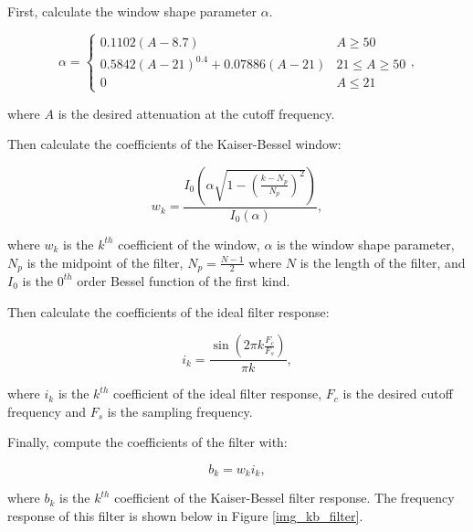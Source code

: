                 First, calculate the window shape parameter $\alpha$. 

                \begin{equation}
                    \alpha = 
                        \begin{cases}
                            0.1102(A - 8.7) & A \ge 50 \\
                            0.5842(A-21)^{0.4} + 0.07886(A-21) & 21 \leq A \geq 50 \\
                            0 & A \le 21
                        \end{cases},
                \end{equation}

                where $A$ is the desired attenuation at the cutoff frequency.

                Then calculate the coefficients of the Kaiser-Bessel window:

                \begin{equation}
                w_k = \frac{I_0(\alpha \sqrt{1 - (\frac{k - N_p}{N_p})^2})}{I_0(\alpha)},
                \end{equation}

                where $w_k$ is the $k^{th}$ coefficient of the window, $\alpha$ is the window shape parameter, $N_p$ is the midpoint of the filter, $N_p = \frac{N-1}{2}$ where $N$ is the length of the filter, and $I_0$ is the $0^{th}$ order Bessel function of the first kind.

                Then calculate the coefficients of the ideal filter response:

                \begin{equation}
                i_k = \frac{\sin(2\pi k\frac{F_c}{F_s})}{\pi k},
                \end{equation}

                where $i_k$ is the $k^{th}$ coefficient of the ideal filter response, $F_c$ is the desired cutoff frequency and $F_s$ is the sampling frequency.

                Finally, compute the coefficients of the filter with: 

                \begin{equation}
                b_k = w_ki_k,
                \end{equation}

                where $b_k$ is the $k^{th}$ coefficient of the Kaiser-Bessel filter response. The frequency response of this filter is shown below in Figure \ref{img_kb_filter}.

